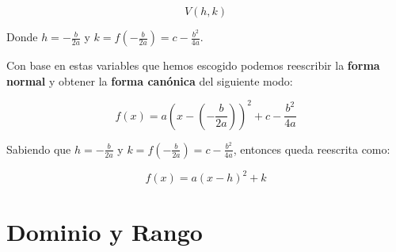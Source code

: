 \documentclass[A4paper, 10pt, oneside]{book}
\begin{document}
	$$V(h, k)$$
	
	Donde $\displaystyle{h=-\frac{b}{2a}}$ y $\displaystyle{k=f\left(-\frac{b}{2a}\right) = c-\frac{b^2}{4a}}$.\newline
	
	Con base en estas variables que hemos escogido podemos reescribir la \textbf{forma normal} y obtener la \textbf{forma canónica} del siguiente modo:\newline
	
	$$f(x)=a\left(x-\left(-\frac{b}{2a}\right)\right)^2+c-\frac{b^2}{4a}$$\newline
	
	Sabiendo que $\displaystyle{h=-\frac{b}{2a}}$ y $\displaystyle{k=f\left(-\frac{b}{2a}\right) = c-\frac{b^2}{4a}}$, entonces queda reescrita como:\newline
	
	\begin{tcolorbox}[colback=white]
		$$f(x)=a\left(x-h\right)^2+k$$
	\end{tcolorbox}
	
	\section{Dominio y Rango}
	
\end{document}
